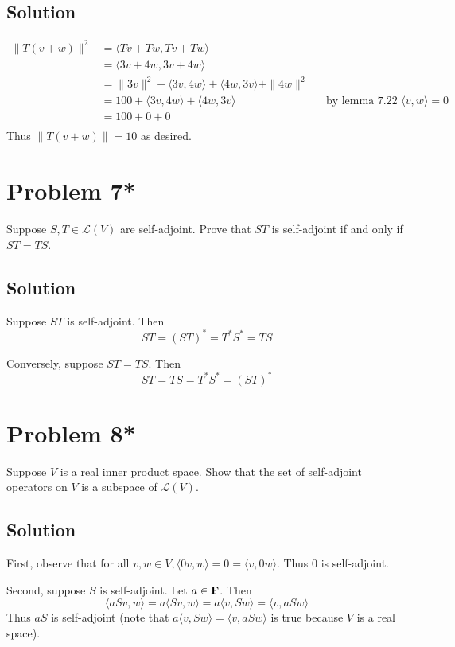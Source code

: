 \documentclass{article}
\begin{document}
\subsection*{Solution}
\begin{align*}
    \|T(v+w)\|^2&=\langle Tv+Tw,Tv+Tw\rangle\\
    &=\langle 3v+4w,3v+4w\rangle\\
    &=\|3v\|^2+\langle 3v,4w\rangle+\langle 4w,3v\rangle+\|4w\|^2\\
    &=100+\langle 3v,4w\rangle+\langle 4w,3v\rangle&&\text{by lemma 7.22 $\langle v,w\rangle=0$}\\
    &=100 + 0 + 0\\
\end{align*}
Thus $\|T(v+w)\|=10$ as desired.

\section*{Problem 7*}
Suppose $S,T\in\mathcal{L}(V)$ are self-adjoint. Prove that $ST$ is self-adjoint if and only if $ST=TS$.

\subsection*{Solution}
Suppose $ST$ is self-adjoint. Then
\[ST=(ST)^*=T^*S^*=TS\]

Conversely, suppose $ST=TS$. Then
\[ST=TS=T^*S^*=(ST)^*\]

\section*{Problem 8*}
Suppose $V$ is a real inner product space. Show that the set of self-adjoint operators on $V$ is a subspace of $\mathcal{L}(V)$.

\subsection*{Solution}
First, observe that for all $v,w\in V, \langle 0v, w\rangle=0=\langle v, 0w\rangle$. Thus $0$ is self-adjoint.

\vs

Second, suppose $S$ is self-adjoint. Let $a\in\mathbf{F}$. Then
\[\langle aSv, w\rangle=a\langle Sv, w\rangle=a\langle v, Sw\rangle=\langle v, aSw\rangle\]
Thus $aS$ is self-adjoint (note that $a\langle v, Sw\rangle=\langle v, aSw\rangle$ is true because $V$ is a real space).

\vs
\end{document}
